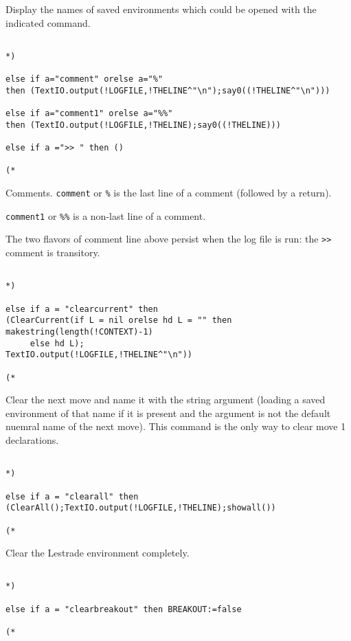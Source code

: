 \documentclass{article}
\begin{document}
Display the names of saved environments which could be opened with the indicated command.

\begin{verbatim}

*)

else if a="comment" orelse a="%" 
then (TextIO.output(!LOGFILE,!THELINE^"\n");say0((!THELINE^"\n")))

else if a="comment1" orelse a="%%" 
then (TextIO.output(!LOGFILE,!THELINE);say0((!THELINE)))

else if a =">> " then ()

(*

\end{verbatim}

Comments.   {\tt comment} or {\tt \%} is the last line of a comment (followed by a return).

{\tt comment1} or {\tt \%\%} is a non-last line of a comment.

The two flavors of comment line above persist when the log file is run:  the {\tt >>} comment is transitory.

\begin{verbatim}

*)

else if a = "clearcurrent" then 
(ClearCurrent(if L = nil orelse hd L = "" then makestring(length(!CONTEXT)-1) 
     else hd L);
TextIO.output(!LOGFILE,!THELINE^"\n"))

(*

\end{verbatim}

Clear the next move and name it with the string argument (loading a saved environment of that name if it is present and the argument is not the default nuemral name of the next move).
This command is the only way to clear move 1 declarations.

\begin{verbatim}

*)

else if a = "clearall" then (ClearAll();TextIO.output(!LOGFILE,!THELINE);showall())

(*

\end{verbatim}

Clear the Lestrade environment completely.

\begin{verbatim}

*)

else if a = "clearbreakout" then BREAKOUT:=false

(*

\end{verbatim}
\end{document}
